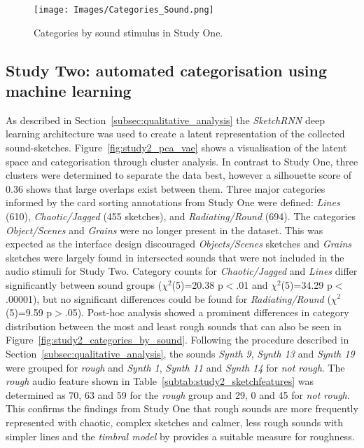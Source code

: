 \documentclass[]{interact}
\theoremstyle{plain}%
\theoremstyle{definition}
\theoremstyle{remark}
\begin{document}
\begin{figure}[h]
\centering
\texttt{[image: Images/Categories\_Sound.png]}
\caption{Categories by sound stimulus in Study One.\label{fig:categories_by_sound}}
\end{figure}

\subsection{Study Two: automated categorisation using machine learning}\label{subsec:categorisation_two}
As described in Section~\ref{subsec:qualitative_analysis} the \textit{SketchRNN} deep learning architecture was used to create a latent representation of the collected sound-sketches. Figure~\ref{fig:study2_pca_vae} shows a visualisation of the latent space and categorisation through cluster analysis. In contrast to Study One, three clusters were determined to separate the data best, however a silhouette score of 0.36 shows that large overlaps exist between them. Three major categories informed by the card sorting annotations from Study One were defined: \textit{Lines} (610), \textit{Chaotic/Jagged} (455 sketches),  and \textit{Radiating/Round} (694). The categories \textit{Object/Scenes} and \textit{Grains} were no longer present in the dataset. This was expected as the interface design discouraged \textit{Objects/Scenes} sketches and \textit{Grains} sketches were largely found in intersected sounds that were not included in the audio stimuli for Study Two. Category counts for \textit{Chaotic/Jagged} and \textit{Lines} differ significantly between sound groups (${\chi}^2$(5)=20.38 p$<$.01 and ${\chi}^2$(5)=34.29 p$<$.00001), but no significant differences could be found for \textit{Radiating/Round} (${\chi}^2$(5)=9.59 p$>$.05). Post-hoc analysis showed a prominent differences in category distribution between the most and least rough sounds that can also be seen in Figure~\ref{fig:study2_categories_by_sound}. Following the procedure described in Section~\ref{subsec:qualitative_analysis}, the sounds \textit{Synth 9}, \textit{Synth 13} and \textit{Synth 19} were grouped for \textit{rough} and \textit{Synth 1}, \textit{Synth 11} and \textit{Synth 14} for \textit{not rough}. The \textit{rough} audio feature shown in Table~\ref{subtab:study2_sketchfeatures} was determined as 70, 63 and 59 for the \textit{rough} group and 29, 0 and 45 for \textit{not rough}. This confirms the findings from Study One that rough sounds are more frequently represented with chaotic, complex sketches and calmer, less rough sounds with simpler lines and the \textit{timbral model} by  provides a suitable measure for roughness. 
\end{document}
